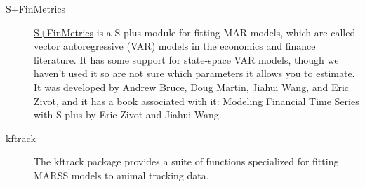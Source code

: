\begin{description}
		\item[S+FinMetrics] \href{http://faculty.washington.edu/ezivot/MFTS2ndEditionFinMetrics.htm}{S+FinMetrics} is a S-plus module for fitting MAR models, which are called vector autoregressive (VAR) models in the economics and finance literature.  It has some support for state-space VAR models, though we haven't used it so are not sure which parameters it allows you to estimate.  It was developed by Andrew Bruce, Doug Martin, Jiahui Wang, and Eric Zivot, and it has a book associated with it: Modeling Financial Time Series with S-plus by Eric Zivot and Jiahui Wang.
		\item[kftrack] The kftrack \R package provides a suite of functions specialized for fitting MARSS models to animal tracking data.
\end{description}